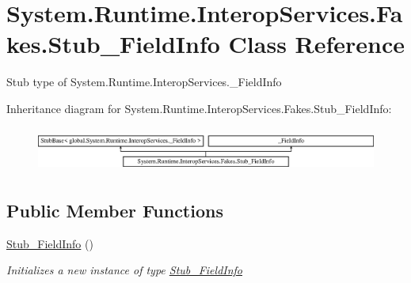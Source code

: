 \hypertarget{class_system_1_1_runtime_1_1_interop_services_1_1_fakes_1_1_stub___field_info}{\section{System.\-Runtime.\-Interop\-Services.\-Fakes.\-Stub\-\_\-\-Field\-Info Class Reference}
\label{class_system_1_1_runtime_1_1_interop_services_1_1_fakes_1_1_stub___field_info}
}


Stub type of System.\-Runtime.\-Interop\-Services.\-\_\-\-Field\-Info 


Inheritance diagram for System.\-Runtime.\-Interop\-Services.\-Fakes.\-Stub\-\_\-\-Field\-Info\-:\begin{figure}[H]
\begin{center}
\leavevmode
\includegraphics[height=1.489362cm]{class_system_1_1_runtime_1_1_interop_services_1_1_fakes_1_1_stub___field_info}
\end{center}
\end{figure}
\subsection*{Public Member Functions}
\begin{DoxyCompactItemize}
\item 
\hyperlink{class_system_1_1_runtime_1_1_interop_services_1_1_fakes_1_1_stub___field_info_af4a706263292d7ffdc149a885d8c4d30}{Stub\-\_\-\-Field\-Info} ()
\begin{DoxyCompactList}\small\item\em Initializes a new instance of type \hyperlink{class_system_1_1_runtime_1_1_interop_services_1_1_fakes_1_1_stub___field_info}{Stub\-\_\-\-Field\-Info}\end{DoxyCompactList}\end{DoxyCompactItemize}

